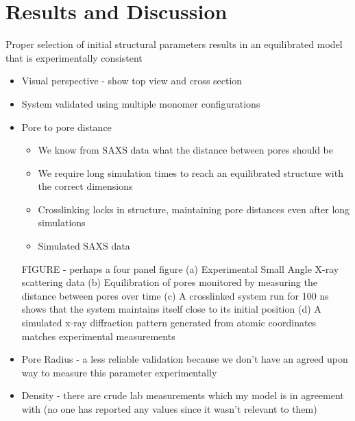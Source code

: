 \documentclass{article}
\begin{document}
	\section{Results and Discussion}

	Proper selection of initial structural parameters results in an equilibrated model that is experimentally consistent 
	\begin{itemize}
		\item Visual perspective - show top view and cross section
		\item System validated using multiple monomer configurations 
		\item Pore to pore distance
		\begin{itemize}
			\item We know from SAXS data what the distance between pores should be
			\item We require long simulation times to reach an equilibrated structure with the correct dimensions
			\item Crosslinking locks in structure, maintaining pore distances even after long simulations
			\item Simulated SAXS data
		\end{itemize}
		FIGURE - perhaps a four panel figure
		(a) Experimental Small Angle X-ray scattering data
		(b) Equilibration of pores monitored by measuring the distance between pores over time
		(c) A crosslinked system run for 100 ns shows that the system maintains itself close to its initial position 
		(d) A simulated x-ray diffraction pattern generated from atomic coordinates matches experimental measurements  	
		\item Pore Radius - a less reliable validation because we don't have an agreed upon way to measure this parameter experimentally
		\item Density - there are crude lab measurements which my model is in agreement with (no one has reported any values since it wasn't relevant to them)
	\end{itemize}
	
\end{document}
